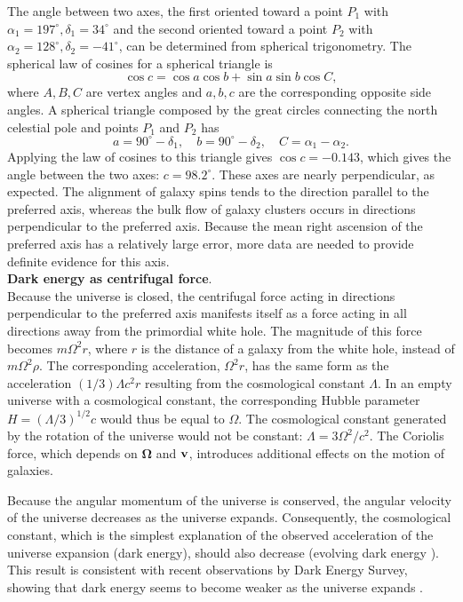 \documentclass[prd,onecolumn,nofootinbib]{revtex4}
\begin{document}
The angle between two axes, the first oriented toward a point $P_1$ with $\alpha_1=197^\circ, \delta_1=34^\circ$ and the second oriented toward a point $P_2$ with $\alpha_2=128^\circ, \delta_2=-41^\circ$, can be determined from spherical trigonometry.
The spherical law of cosines for a spherical triangle is
\begin{equation}
\cos c=\cos a\cos b+\sin a\sin b\cos C,
\end{equation}
where $A,B,C$ are vertex angles and $a,b,c$ are the corresponding opposite side angles.
A spherical triangle composed by the great circles connecting the north celestial pole and points $P_1$ and $P_2$ has
\begin{equation}
a=90^\circ-\delta_1,\quad b=90^\circ-\delta_2,\quad C=\alpha_1-\alpha_2.
\end{equation}
Applying the law of cosines to this triangle gives $\cos c=-0.143$, which gives the angle between the two axes: $c=98.2^\circ$.
These axes are nearly perpendicular, as expected.
The alignment of galaxy spins tends to the direction parallel to the preferred axis, whereas the bulk flow of galaxy clusters occurs in directions perpendicular to the preferred axis.
Because the mean right ascension of the preferred axis has a relatively large error, more data are needed to provide definite evidence for this axis.\\


\noindent
{\bf Dark energy as centrifugal force}.\\
Because the universe is closed, the centrifugal force acting in directions perpendicular to the preferred axis manifests itself as a force acting in all directions away from the primordial white hole.
The magnitude of this force becomes $m\Omega^2 r$, where $r$ is the distance of a galaxy from the white hole, instead of $m\Omega^2\rho$.
The corresponding acceleration, $\Omega^2 r$, has the same form as the acceleration $(1/3)\Lambda c^2 r$ resulting from the cosmological constant $\Lambda$.
In an empty universe with a cosmological constant, the corresponding Hubble parameter $H=(\Lambda/3)^{1/2}c$ would thus be equal to $\Omega$.
The cosmological constant generated by the rotation of the universe would not be constant: $\Lambda=3\Omega^2/c^2$.
The Coriolis force, which depends on ${\bm\Omega}$ and ${\bf v}$, introduces additional effects on the motion of galaxies.

Because the angular momentum of the universe is conserved, the angular velocity of the universe decreases as the universe expands.
Consequently, the cosmological constant, which is the simplest explanation of the observed acceleration of the universe expansion (dark energy), should also decrease (evolving dark energy \cite{Avi}).
This result is consistent with recent observations by Dark Energy Survey, showing that dark energy seems to become weaker as the universe expands \cite{DES}.
\end{document}
